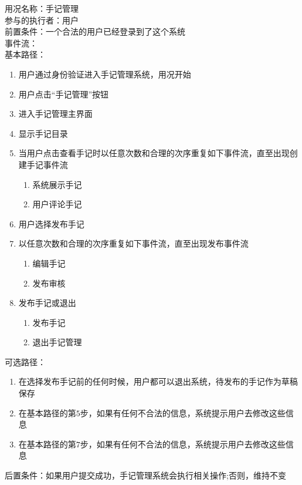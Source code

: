 \begin{framed}
\noindent
用况名称：手记管理\\
参与的执行者：用户\\
前置条件：一个合法的用户已经登录到了这个系统\\
事件流：\\
基本路径：
\begin{enumerate}[itemsep=2pt,topsep=0pt,parsep=0pt,itemindent=1em]
    \item 用户通过身份验证进入手记管理系统，用况开始
    \item 用户点击“手记管理”按钮
    \item 进入手记管理主界面
    \item 显示手记目录
    \item 当用户点击查看手记时以任意次数和合理的次序重复如下事件流，直至出现创建手记事件流
    \begin{enumerate}[itemsep=2pt,topsep=0pt,parsep=0pt,itemindent=1em]
          \item 系统展示手记
          \item 用户评论手记
      \end{enumerate}
    \item 用户选择发布手记
    \item 以任意次数和合理的次序重复如下事件流，直至出现发布事件流
    \begin{enumerate}[itemsep=2pt,topsep=0pt,parsep=0pt,itemindent=1em]
          \item 编辑手记
          \item 发布审核
      \end{enumerate}
    \item 发布手记或退出
        \begin{enumerate}[itemsep=2pt,topsep=0pt,parsep=0pt,itemindent=1em]
          \item 发布手记
          \item 退出手记管理
      \end{enumerate}
\end{enumerate}
\noindent
可选路径：\par
   \begin{enumerate}[itemsep=2pt,topsep=0pt,parsep=0pt,itemindent=1em]  \item 在选择发布手记前的任何时候，用户都可以退出系统，待发布的手记作为草稿保存 \item 在基本路径的第$5$步，如果有任何不合法的信息，系统提示用户去修改这些信息\item 在基本路径的第$7$步，如果有任何不合法的信息，系统提示用户去修改这些信息  \end{enumerate} 
后置条件：如果用户提交成功，手记管理系统会执行相关操作;否则，维持不变
\end{framed}

